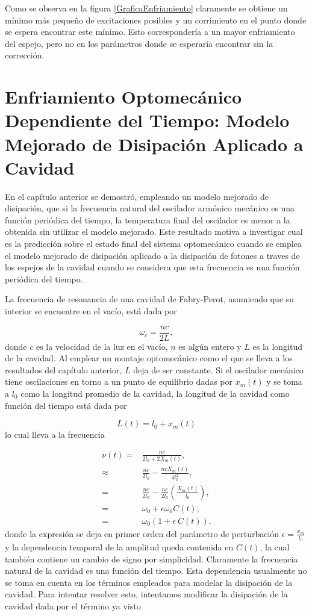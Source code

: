 \documentclass[10pt,a4paper]{report}
\begin{document}
Como se observa en la figura \ref{GraficaEnfriamiento} claramente se obtiene un mínimo más pequeño de excitaciones posibles y un corrimiento en el punto donde se espera encontrar este mínimo. Esto correspondería a un mayor enfriamiento del espejo, pero no en los parámetros donde se esperaría encontrar sin la corrección.

\chapter{Enfriamiento Optomecánico Dependiente del Tiempo: Modelo Mejorado de Disipación Aplicado a Cavidad}

En el capítulo anterior se demostró, empleando un modelo mejorado de disipación, que si la frecuencia natural del oscilador armónico mecánico es una función periódica del tiempo, la temperatura final del oscilador es menor a la obtenida sin utilizar el modelo mejorado. Este resultado motiva a investigar cual es la predicción sobre el estado final del sistema optomecánico cuando se emplea el modelo mejorado de disipación aplicado a la disipación de fotones a traves de los espejos de la cavidad cuando se considera que esta frecuencia es una función periódica del tiempo.
 
La frecuencia de resonancia de una cavidad de Fabry-Perot, asumiendo que su interior se encuentre en el vacío, está dada por

\begin{equation}
\omega_c = \frac{nc}{2L},
\end{equation} donde $c$ es la velocidad de la luz en el vacío, $n$ es algún entero y $L$ es la longitud de la cavidad. Al emplear un montaje optomecánico como el que se lleva a los resultados del capítulo anterior, $L$ deja de ser constante. Si el oscilador mecánico tiene oscilaciones en torno a un punto de equilibrio dadas por $x_m(t)$ y se toma a $l_0$ como la longitud promedio de la cavidad, la longitud de la cavidad como función del tiempo está dada por

\begin{equation}
L(t) = l_0 + x_m(t)
\end{equation} lo cual lleva a la frecuencia 

\begin{align}
\nu(t) =& \frac{nc}{2l_0+2X_m(t)}, \\
\approx& \frac{nc}{2l_0} - \frac{nc X_m(t)}{4l_0^2}, \\
=& \frac{nc}{2l_0} - \frac{nc}{2l_0}(\frac{X_m(t)}{l_0}), \\
=& \omega_0 + \epsilon\omega_0C(t), \\
=& \omega_0(1+\epsilon\ C(t)).
\end{align} donde la expresión se deja en primer orden del parámetro de perturbación $\epsilon = \frac{x_m}{l_0}$ y la dependencia temporal de la amplitud queda contenida en $C(t)$, la cual también contiene un cambio de signo por simplicidad. Claramente la frecuencia natural de la cavidad es una función del tiempo. Esta dependencia usualmente no se toma en cuenta en los términos empleados para modelar la disipación de la cavidad. Para intentar resolver esto, intentamos modificar la disipación de la cavidad dada por el término ya visto
\end{document}
